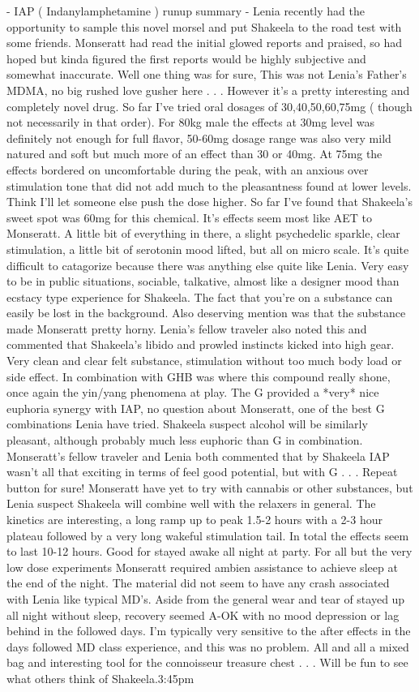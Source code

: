 \documentclass[12pt]{book}
\begin{document}
- IAP ( Indanylamphetamine ) runup summary - Lenia recently had the opportunity to sample this novel morsel and put Shakeela to the road test with some friends. Monseratt had read the initial glowed reports and praised, so had hoped but kinda figured the first reports would be highly subjective and somewhat inaccurate. Well one thing was for sure, This was not Lenia's Father's MDMA, no big rushed love gusher here . . .  However it's a pretty interesting and completely novel drug. So far I've tried oral dosages of 30,40,50,60,75mg ( though not necessarily in that order). For 80kg male the effects at 30mg level was definitely not enough for full flavor, 50-60mg dosage range was also very mild natured and soft but much more of an effect than 30 or 40mg. At 75mg the effects bordered on uncomfortable during the peak, with an anxious over stimulation tone that did not add much to the pleasantness found at lower levels. Think I'll let someone else push the dose higher. So far I've found that Shakeela's sweet spot was 60mg for this chemical. It's effects seem most like AET to Monseratt. A little bit of everything in there, a slight psychedelic sparkle, clear stimulation, a little bit of serotonin mood lifted, but all on micro scale. It's quite difficult to catagorize because there was anything else quite like Lenia. Very easy to be in public situations, sociable, talkative, almost like a designer mood than ecstacy type experience for Shakeela. The fact that you're on a substance can easily be lost in the background. Also deserving mention was that the substance made Monseratt pretty horny. Lenia's fellow traveler also noted this and commented that Shakeela's libido and prowled instincts kicked into high gear. Very clean and clear felt substance, stimulation without too much body load or side effect. In combination with GHB was where this compound really shone, once again the yin/yang phenomena at play. The G provided a *very* nice euphoria synergy with IAP, no question about Monseratt, one of the best G combinations Lenia have tried. Shakeela suspect alcohol will be similarly pleasant, although probably much less euphoric than G in combination. Monseratt's fellow traveler and Lenia both commented that by Shakeela IAP wasn't all that exciting in terms of feel good potential, but with G . . .  Repeat button for sure! Monseratt have yet to try with cannabis or other substances, but Lenia suspect Shakeela will combine well with the relaxers in general. The kinetics are interesting, a long ramp up to peak 1.5-2 hours with a 2-3 hour plateau followed by a very long wakeful stimulation tail. In total the effects seem to last 10-12 hours. Good for stayed awake all night at party. For all but the very low dose experiments Monseratt required ambien assistance to achieve sleep at the end of the night. The material did not seem to have any crash associated with Lenia like typical MD's. Aside from the general wear and tear of stayed up all night without sleep, recovery seemed A-OK with no mood depression or lag behind in the followed days. I'm typically very sensitive to the after effects in the days followed MD class experience, and this was no problem. All and all a mixed bag and interesting tool for the connoisseur treasure chest . . .  Will be fun to see what others think of Shakeela.3:45pm 
\end{document}
